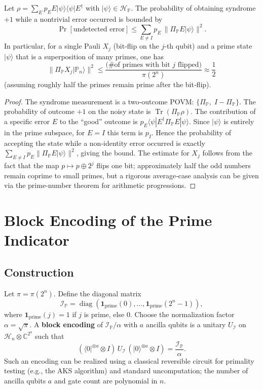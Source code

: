 \documentclass[12pt,a4paper]{article}
\begin{document}
\begin{proposition}\label{prop:undetected}
Let \(\rho = \sum_{E} p_E E|\psi\rangle\langle\psi|E^\dagger\) with \(|\psi\rangle\in\mathcal{H}_{\mathbb{P}}\).  The probability of obtaining syndrome \(+1\) while a nontrivial error occurred is bounded by
\[
\Pr[\text{undetected error}] \le \sum_{E\neq I} p_E \,\| \Pi_{\mathbb{P}} E |\psi\rangle\|^2 .
\]
In particular, for a single Pauli \(X_j\) (bit‑flip on the \(j\)-th qubit) and a prime state \(|\psi\rangle\) that is a superposition of many primes, one has
\[
\| \Pi_{\mathbb{P}} X_j |\mathbb{P}_n\rangle\|^2 \le \frac{\text{(\# of primes with bit }j\text{ flipped})}{\pi(2^n)} \approx \frac{1}{2}
\]
(assuming roughly half the primes remain prime after the bit‑flip).
\end{proposition}
\begin{proof}
The syndrome measurement is a two‑outcome POVM: \(\{ \Pi_{\mathbb{P}},\; I-\Pi_{\mathbb{P}}\}\).  The probability of outcome \(+1\) on the noisy state is \(\operatorname{Tr}(\Pi_{\mathbb{P}}\rho)\).  The contribution of a specific error \(E\) to the “good” outcome is \(p_E \langle\psi|E^\dagger\Pi_{\mathbb{P}} E|\psi\rangle\).  Since \(|\psi\rangle\) is entirely in the prime subspace, for \(E=I\) this term is \(p_I\).  Hence the probability of accepting the state while a non‑identity error occurred is exactly \(\sum_{E\neq I} p_E \| \Pi_{\mathbb{P}} E |\psi\rangle\|^2\), giving the bound.  The estimate for \(X_j\) follows from the fact that the map \(p \mapsto p \oplus 2^j\) flips one bit; approximately half the odd numbers remain coprime to small primes, but a rigorous average‑case analysis can be given via the prime‑number theorem for arithmetic progressions.
\end{proof}

\section{Block Encoding of the Prime Indicator}

\subsection{Construction}
Let \(\pi=\pi(2^n)\).  Define the diagonal matrix
\[
\mathcal{I}_{\mathbb{P}} = \operatorname{diag}(\mathbf{1}_{\text{prime}}(0),\dots,\mathbf{1}_{\text{prime}}(2^n-1)),
\]
where \(\mathbf{1}_{\text{prime}}(j)=1\) if \(j\) is prime, else \(0\).  Choose the normalization factor \(\alpha = \sqrt{\pi}\).  A \textbf{block encoding} of \(\mathcal{I}_{\mathbb{P}}/\alpha\) with \(a\) ancilla qubits is a unitary \(U_{\mathcal{I}}\) on \(\mathcal{H}_n\otimes \mathbb{C}^{2^a}\) such that
\[
(\langle 0|^{\otimes a}\otimes I)\, U_{\mathcal{I}}\, (|0\rangle^{\otimes a}\otimes I) = \frac{\mathcal{I}_{\mathbb{P}}}{\alpha}.
\]
Such an encoding can be realized using a classical reversible circuit for primality testing (e.g., the AKS algorithm) and standard uncomputation; the number of ancilla qubits \(a\) and gate count are polynomial in \(n\).
\end{document}
